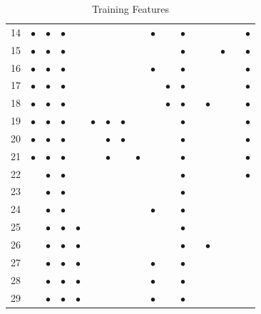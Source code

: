 \begin{landscape}
\begin{table}
\begin{center}
\begin{tabular}{|c|c|c|c|c|c|c|c|c|c|c|c|c|c|c|c|c|}
        14 & $\bullet$ & $\bullet$ & $\bullet$ & & & & & & $\bullet$ & & $\bullet$ & & & & & $\bullet$ \\
        15 & $\bullet$ & $\bullet$ & $\bullet$ & & & & & & & & $\bullet$ & & & $\bullet$ & & $\bullet$ \\
        16 & $\bullet$ & $\bullet$ & $\bullet$ & & & & & & $\bullet$ & & $\bullet$ & & & & & $\bullet$ \\ %
        17 & $\bullet$ & $\bullet$ & $\bullet$ & & & & & & & $\bullet$ & $\bullet$ & & & & & $\bullet$ \\ %
        18 & $\bullet$ & $\bullet$ & $\bullet$ & & & & & & & $\bullet$ & $\bullet$ & & $\bullet$ & & & $\bullet$ \\ %
        19 & $\bullet$ & $\bullet$ & $\bullet$ & & $\bullet$ & $\bullet$ & $\bullet$ & & & & $\bullet$ & & & & & $\bullet$ \\
        20 & $\bullet$ & $\bullet$ & $\bullet$ & & & $\bullet$ & $\bullet$ & & & & $\bullet$ & & & & & $\bullet$ \\
        21 & $\bullet$ & $\bullet$ & $\bullet$ & & & $\bullet$ & & $\bullet$ & & & $\bullet$ & & & & & $\bullet$ \\
        22 & & $\bullet$ & $\bullet$ & & & & & & & & $\bullet$ & & & & & $\bullet$ \\
        23 & & $\bullet$ & $\bullet$ & & & & & & & & $\bullet$ & & & & & \\
        24 & & $\bullet$ & $\bullet$ & & & & & & $\bullet$ & & $\bullet$ & & & & & \\
        25 & & $\bullet$ & $\bullet$ & $\bullet$ & & & & & & & $\bullet$ & & & & & \\
        26 & & $\bullet$ & $\bullet$ & $\bullet$ & & & & & & & $\bullet$ & & $\bullet$ & & & \\
        27 & & $\bullet$ & $\bullet$ & $\bullet$ & & & & & $\bullet$ & & $\bullet$ & & & & & \\ %
        28 & & $\bullet$ & $\bullet$ & $\bullet$ & & & & & $\bullet$ & & $\bullet$ & & & & & \\
        29 & & $\bullet$ & $\bullet$ & $\bullet$ & & & & & $\bullet$ & & $\bullet$ & & & & & \\ %
        \hline
    \end{tabular}
    \caption{Training Features}
    \label{tab:training_features}
\end{center}
\end{table}
\restoregeometry
\end{landscape}
\thispagestyle{plain}




